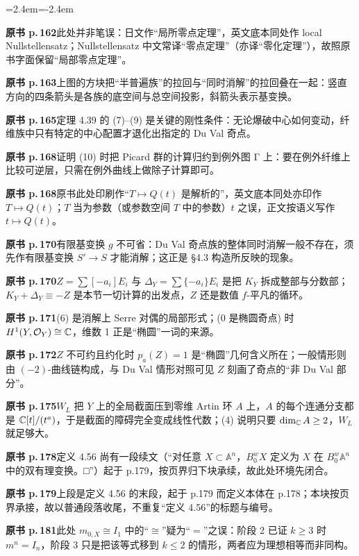 \begin{list}{}{\leftmargin=2.4em\itemindent=-2.4em\itemsep=2pt\parsep=0pt}
\item \textbf{原书 p.\,162}\quad 此处并非笔误：日文作“局所零点定理”，英文底本同处作 local Nullstellensatz；Nullstellensatz 中文常译“零点定理”（亦译“零化定理”），故照原书字面保留“局部零点定理”。
\item \textbf{原书 p.\,163}\quad 上图的方块把“半普遍族”的拉回与“同时消解”的拉回叠在一起：竖直方向的四条箭头是各族的底空间与总空间投影，斜箭头表示基变换。
\item \textbf{原书 p.\,165}\quad 定理 4.39 的 (7)–(9) 是关键的刚性条件：无论爆破中心如何变动，纤维族中只有特定的中心配置才退化出指定的 Du Val 奇点。
\item \textbf{原书 p.\,168}\quad 证明 (10) 时把 Picard 群的计算归约到例外图 Γ 上：要在例外纤维上比较可逆层，只需在例外曲线上做除子计算即可。
\item \textbf{原书 p.\,168}\quad 原书此处印刷作“$T\mapsto Q(t)$ 是解析的”，英文底本同处亦印作 $T\mapsto Q(t)$；$T$ 当为参数（或参数空间 $T$ 中的参数）$t$ 之误，正文按语义写作 $t\mapsto Q(t)$。
\item \textbf{原书 p.\,170}\quad 有限基变换 $g$ 不可省：Du Val 奇点族的整体同时消解一般不存在，须先作有限基变换 $S'\to S$ 才能消解；这正是 §4.3 构造所反映的现象。
\item \textbf{原书 p.\,170}\quad $Z=\sum[-a_i]E_i$ 与 $\Delta_Y=\sum\{-a_i\}E_i$ 是把 $K_Y$ 拆成整部与分数部；$K_Y+\Delta_Y\equiv -Z$ 是本节一切计算的出发点，$Z$ 还是数值 $f$-平凡的循环。
\item \textbf{原书 p.\,171}\quad (6) 是消解上 Serre 对偶的局部形式；(0 是椭圆奇点) 时 $H^1(Y,\mathcal{O}_Y)\cong\mathbb{C}$，维数 1 正是“椭圆”一词的来源。
\item \textbf{原书 p.\,172}\quad $Z$ 不可约且约化时 $p_a(Z)=1$ 是“椭圆”几何含义所在；一般情形则由 $(-2)$-曲线链构成，与 Du Val 情形对照可见 $Z$ 刻画了奇点的“非 Du Val 部分”。
\item \textbf{原书 p.\,175}\quad $W_L$ 把 $Y$ 上的全局截面压到零维 Artin 环 $A$ 上，$A$ 的每个连通分支都是 $\mathbb{C}[t]/(t^a)$，于是截面的障碍完全变成线性代数；(4) 说明只要 $\dim_{\mathbb{C}}A\ge 2$，$W_L$ 就足够大。
\item \textbf{原书 p.\,178}\quad 定义 4.56 尚有一段续文（“对任意 $X\subset\mathbb{A}^n$，$B_0^wX$ 定义为 $X$ 在 $B_0^w\mathbb{A}^n$ 中的双有理变换。□”）起于 p.179，按页界归下块承续，故此处环境先闭合。
\item \textbf{原书 p.\,179}\quad 上段是定义 4.56 的末段，起于 p.179 而定义本体在 p.178；本块按页界承接，故以普通段落收尾，不重复“定义 4.56”的标题与编号。
\item \textbf{原书 p.\,181}\quad 此处 $m_{0,X}\cong I_1$ 中的“$\cong$”疑为“$=$”之误：阶段 2 已证 $k\ge 3$ 时 $m^n=I_n$，阶段 3 只是把该等式移到 $k\le 2$ 的情形，两者应为理想相等而非同构。

\end{list}
